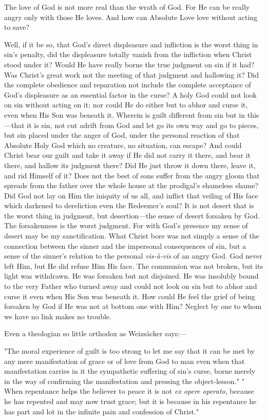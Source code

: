 \documentclass[12pt,letterpaper,oneside]{book}
\begin{document}
The love of God is not more real than the wrath of God. 
For He can be really angry only with those He loves. 
And how can Absolute Love love without acting to save? 

Well, if it be so, that God's direct displeasure and 
infliction is the worst thing in sin's penalty, did the displeasure 
totally vanish from the infliction when Christ 
stood under it? Would He have really borne the true 
judgment on sin if it had? Was Christ's great work not 
the meeting of that judgment and hallowing it? Did 
the complete obedience and reparation not include the 
complete acceptance of God's displeasure as an essential 
factor in the curse? A holy God could not look on sin 
without acting on it; nor could He do either but to abhor 
and curse it, even when His Son was beneath it. Wherein 
is guilt different from sin but in this---that it is sin, not 
cut adrift from God and let go its own way and go to 
pieces, but sin placed under the anger of God, under the 
personal reaction of that Absolute Holy God which no 
creature, no situation, can escape? And could Christ bear 
our guilt and take it away if He did not carry it there, and 
bear it there, and hallow its judgment there? Did He 
just throw it down there, leave it, and rid Himself of it? 
Does not the best of sons suffer from the angry gloom that 
spreads from the father over the whole house at the 
prodigal's shameless shame? Did God not lay on Him the 
iniquity of us all, and inflict that veiling of His face which 
darkened to dereliction even the Redeemer's soul? It is 
not desert that is the worst thing in judgment, but desertion---the 
sense of desert forsaken by God. The forsakenness 
is the worst judgment. For with God's presence 
my sense of desert may be my sanctification. What 
Christ bore was not simply a sense of the connection 
between the sinner and the impersonal consequences of 
sin, but a sense of the sinner's relation to the personal 
\textit{vis-\`{a}-vis} of an angry God. God never left Him, but He 
did refuse Him His face. The communion was not broken, 
but its light was withdrawn. He was forsaken but not 
disjoined. He was insolubly bound to the very Father 
who turned away and could not look on sin but to abhor 
and curse it even when His Son was beneath it. How 
could He feel the grief of being forsaken by God if He 
was not at bottom one with Him? Neglect by one to 
whom we have no link makes no trouble. 

Even a theologian so little orthodox as Weizs\"{a}cker 
says:---

"The moral experience of guilt is too strong to let me 
say that it can be met by any mere manifestation of grace 
or of love from God to man even when that manifestation 
carries in it the sympathetic suffering of sin's curse, borne 
merely in the way of confirming the manifestation and 
pressing the object-lesson." " When repentance helps the 
believer to peace it is not \textit{ex opere operato}, because he has 
repented and may now trust grace; but it is because in 
his repentance he has part and lot in the infinite pain and 
confession of Christ." 
\end{document}
